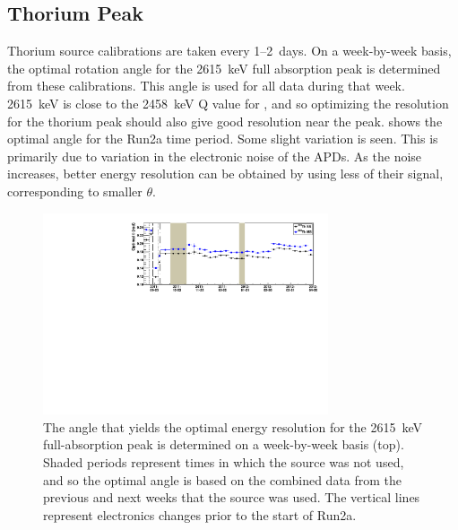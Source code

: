 \documentclass[herrin-thesis.tex]{subfiles}
\begin{document}
\subsection{Thorium Peak}
Thorium source calibrations are taken every 1--2~days. On a week-by-week basis, the optimal rotation angle for the \SI{2615}{\keV} full absorption peak is determined from these calibrations. This angle is used for all data during that week. \SI{2615}{\keV} is close to the \SI{2458}{\keV} Q value for , and so optimizing the resolution for the thorium peak should also give good resolution near the \zeronu{} peak.  shows the optimal angle for the Run2a time period. Some slight variation is seen. This is primarily due to variation in the electronic noise of the APDs. As the noise increases, better energy resolution can be obtained by using less of their signal, corresponding to smaller \(\theta\).

\begin{figure}[htbp]
\centering
	\includegraphics[width=0.75\textwidth]{./plots/data_theta_v_time.pdf}
	\caption[Optimal rotation angle and resulting full-absorption peak energy]{The angle that yields the optimal energy resolution for the \SI{2615}{\keV}  full-absorption peak is determined on a week-by-week basis (top). Shaded periods represent times in which the  source was not used, and so the optimal angle is based on the combined data from the previous and next weeks that the  source was used. The vertical lines represent electronics changes prior to the start of Run2a.}
	\label{fig:data_theta_v_time}
\end{figure}
\end{document}
